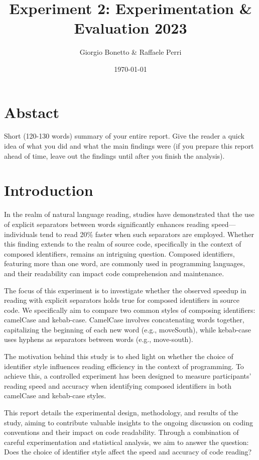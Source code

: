 \documentclass{article}
\title{Experiment 2: Experimentation \& Evaluation 2023}
\author{Giorgio Bonetto \& Raffaele Perri}
\date{\today}
\begin{document}
\maketitle
\section*{Abstact}
Short (120-130 words) summary of your entire report. Give the reader a quick idea of what you did and what the main findings were (if you prepare this report ahead of time, leave out the findings until after you finish the analysis).


\section{Introduction}
In the realm of natural language reading, studies have demonstrated that the use of explicit separators between words significantly enhances reading speed—individuals tend to read 20\% faster when such separators are employed. Whether this finding extends to the realm of source code, specifically in the context of composed identifiers, remains an intriguing question. Composed identifiers, featuring more than one word, are commonly used in programming languages, and their readability can impact code comprehension and maintenance.

The focus of this experiment is to investigate whether the observed speedup in reading with explicit separators holds true for composed identifiers in source code. We specifically aim to compare two common styles of composing identifiers: camelCase and kebab-case. CamelCase involves concatenating words together, capitalizing the beginning of each new word (e.g., moveSouth), while kebab-case uses hyphens as separators between words (e.g., move-south).

The motivation behind this study is to shed light on whether the choice of identifier style influences reading efficiency in the context of programming. To achieve this, a controlled experiment has been designed to measure participants' reading speed and accuracy when identifying composed identifiers in both camelCase and kebab-case styles.

This report details the experimental design, methodology, and results of the study, aiming to contribute valuable insights to the ongoing discussion on coding conventions and their impact on code readability. Through a combination of careful experimentation and statistical analysis, we aim to answer the question: Does the choice of identifier style affect the speed and accuracy of code reading?
\end{document}
